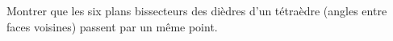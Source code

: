 Montrer que les six plans bissecteurs des dièdres d'un tétraèdre (angles entre faces voisines) passent par un même point.

